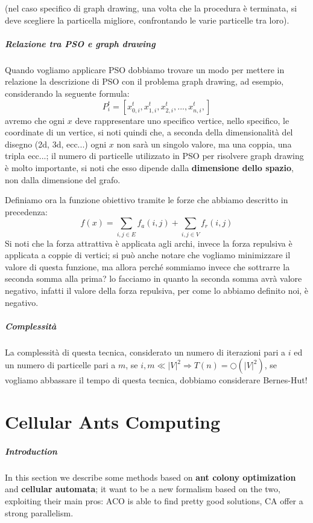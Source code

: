 \documentclass[12pt,a4paper]{report}
\begin{document}
 (nel caso specifico di graph drawing, una volta che la procedura è terminata, si deve scegliere la particella migliore, confrontando le varie particelle tra loro).

\paragraph{Relazione tra PSO e graph drawing}
Quando vogliamo applicare PSO dobbiamo trovare un modo per mettere in relazione la descrizione di PSO con il problema graph drawing, ad esempio, considerando la seguente formula:
$$P_i^{t} = [ x_{0, i}^{t}, x_{1, i}^{t}, x_{2, i}^{t}, ... ,x_{n, i}^{t},] $$
avremo che ogni $x$ deve rappresentare uno specifico vertice, nello specifico, le coordinate di un vertice, si noti quindi che, a seconda della dimensionalità del disegno (2d, 3d, ecc...) ogni $x$ non sarà un singolo valore, ma una coppia, una tripla ecc...; il numero di particelle utilizzato in PSO per risolvere graph drawing è molto importante, si noti che esso dipende dalla \textbf{dimensione dello spazio}, non dalla dimensione del grafo.

Definiamo  ora la funzione obiettivo tramite le forze che abbiamo descritto in precedenza:
$$f(x) = \displaystyle\sum_{i,j \in E} f_a (i, j) + \displaystyle\sum_{i,j \in V} f_r (i, j)$$
Si noti che la forza attrattiva è applicata agli archi, invece la forza repulsiva è applicata a coppie di vertici; si può anche notare che vogliamo minimizzare il valore di questa funzione, ma allora perché sommiamo invece che sottrarre la seconda somma alla prima? lo facciamo in quanto la seconda somma avrà valore negativo, infatti il valore della forza repulsiva, per come lo abbiamo definito noi, è negativo.

\paragraph{Complessità}
La complessità di questa tecnica, considerato un numero di iterazioni pari a $i$ ed un numero di particelle pari a $m$, se $i, m \ll {\vert V \vert}^2 \Rightarrow T(n) = \bigcirc({\vert V \vert}^2)$, se vogliamo abbassare il tempo di questa tecnica, dobbiamo considerare Bernes-Hut!

\chapter{Cellular Ants Computing}

\paragraph{Introduction} In this section we describe some methods based on \textbf{ant colony optimization} and \textbf{cellular automata}; it want to be a new formalism based on the two, exploiting their main pros: ACO is able to find pretty good solutions, CA offer a strong parallelism.
\end{document}
